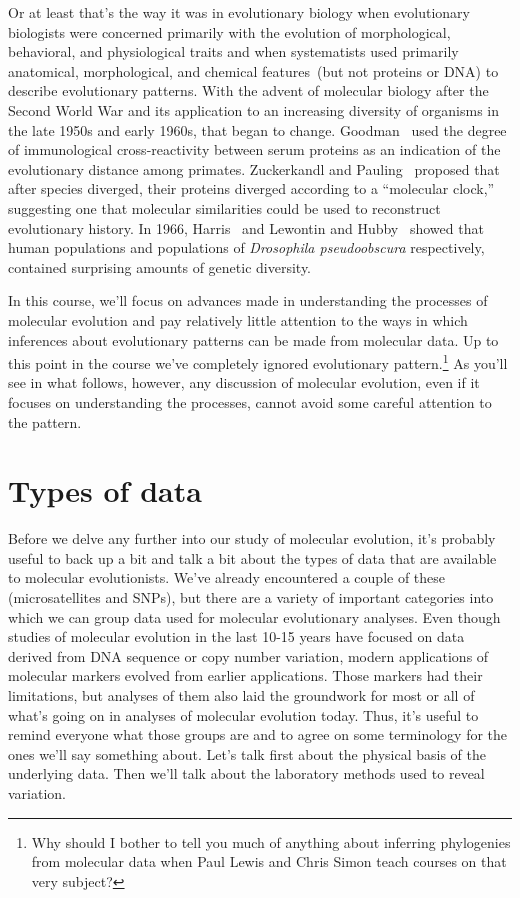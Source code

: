 Or at least that's the way it was in evolutionary biology when
evolutionary biologists were concerned primarily with the evolution of
morphological, behavioral, and physiological traits and when
systematists used primarily anatomical, morphological, and chemical
features~(but not proteins or DNA) to describe evolutionary
patterns. With the advent of molecular biology after the Second World
War and its application to an increasing diversity of organisms in the
late 1950s and early 1960s, that began to
change. Goodman~\cite{Goodman62} used the degree of immunological
cross-reactivity between serum proteins as an indication of the
evolutionary distance among primates. Zuckerkandl and
Pauling~\cite{Zuckerkandl-Pauling65} proposed that after species
diverged, their proteins diverged according to a ``molecular clock,''
suggesting one that molecular similarities could be used to
reconstruct evolutionary history. In 1966, Harris~\cite{Harris66} and
Lewontin and Hubby~\cite{Hubby-Lewontin66,Lewontin-Hubby66} showed
that human populations and populations of {\it Drosophila
  pseudoobscura\/} respectively, contained surprising amounts of
genetic diversity.

In this course, we'll focus on advances made in understanding the
processes of molecular evolution and pay relatively little attention
to the ways in which inferences about evolutionary patterns can be
made from molecular data. Up to this point in the course we've
completely ignored evolutionary pattern.\footnote{Why should I bother
  to tell you much of anything about inferring phylogenies from
  molecular data when Paul Lewis and Chris Simon teach courses on that
  very subject?} As you'll see in what follows, however, any
discussion of molecular evolution, even if it focuses on understanding
the processes, cannot avoid some careful attention to the pattern.

\section*{Types of data}

Before we delve any further into our study of molecular evolution,
it's probably useful to back up a bit and talk a bit about the types
of data that are available to molecular evolutionists. We've already
encountered a couple of these (microsatellites and SNPs), but there
are a variety of important categories into which we can group data
used for molecular evolutionary analyses. Even though studies of
molecular evolution in the last 10-15 years have focused on data
derived from DNA sequence or copy number variation, modern
applications of molecular markers evolved from earlier
applications. Those markers had their limitations, but analyses of
them also laid the groundwork for most or all of what's going on in
analyses of molecular evolution today. Thus, it's useful to remind
everyone what those groups are and to agree on some terminology for
the ones we'll say something about. Let's talk first about the
physical basis of the underlying data. Then we'll talk about the
laboratory methods used to reveal variation.

